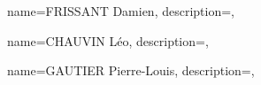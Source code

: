 {
    name={FRISSANT Damien},
    description={},
}

{
    name={CHAUVIN Léo},
    description={},
}

{
    name={GAUTIER Pierre-Louis},
    description={},
}

